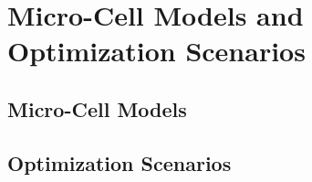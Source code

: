 \section{Micro-Cell Models and Optimization Scenarios}
\label{sec:63models}

\blindtext{}

\subsection{Micro-Cell Models}
\label{sec:631models}

\blindtext{}

\subsection{Optimization Scenarios}
\label{sec:632scenarios}

\blindtext{}
